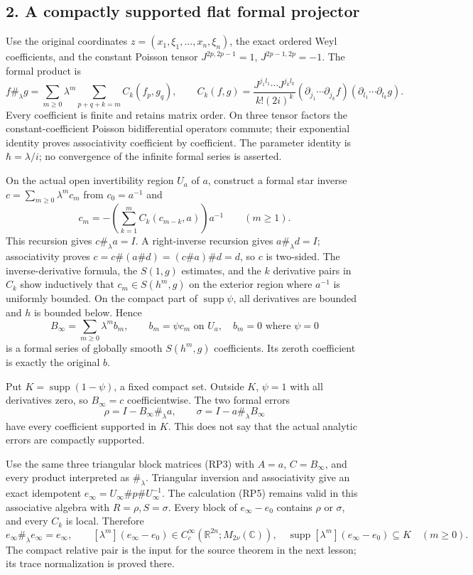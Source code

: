 \documentclass[
  11pt,
]{article}
\begin{document}
\subsection{2. A compactly supported flat formal
projector}\label{a-compactly-supported-flat-formal-projector}

Use the original coordinates \(z=(x_1,\xi_1,\ldots,x_n,\xi_n)\), the
exact ordered Weyl coefficients, and the constant Poisson tensor
\(J^{2p,2p-1}=1\), \(J^{2p-1,2p}=-1\). The formal product is \[
 f\#_\lambda g=\sum_{m\ge0}\lambda^m
       \sum_{p+q+k=m}C_k(f_p,g_q),\qquad
 C_k(f,g)=\frac{J^{j_1l_1}\cdots J^{j_kl_k}}
                {k!(2i)^k}
       (\partial_{j_1}\cdots\partial_{j_k}f)
       (\partial_{l_1}\cdots\partial_{l_k}g).
 \tag{RP7}
\] Every coefficient is finite and retains matrix order. On three tensor
factors the constant-coefficient Poisson bidifferential operators
commute; their exponential identity proves associativity coefficient by
coefficient. The parameter identity is \(\hbar=\lambda/i\); no
convergence of the infinite formal series is asserted.

On the actual open invertibility region \(U_a\) of \(a\), construct a
formal star inverse \(c=\sum_{m\ge0}\lambda^m c_m\) from \(c_0=a^{-1}\)
and \[
 c_m=-\left(\sum_{k=1}^{m}C_k(c_{m-k},a)\right)a^{-1}
 \qquad(m\ge1).
 \tag{RP8}
\] This recursion gives \(c\#_\lambda a=I\). A right-inverse recursion
gives \(a\#_\lambda d=I\); associativity proves
\(c=c\#(a\#d)=(c\#a)\#d=d\), so \(c\) is two-sided. The
inverse-derivative formula, the \(S(1,g)\) estimates, and the \(k\)
derivative pairs in \(C_k\) show inductively that \(c_m\in S(h^m,g)\) on
the exterior region where \(a^{-1}\) is uniformly bounded. On the
compact part of \(\operatorname{supp}\psi\), all derivatives are bounded
and \(h\) is bounded below. Hence \[
 B_\infty=\sum_{m\ge0}\lambda^m b_m,\qquad
 b_m=\psi c_m\text{ on }U_a,\quad b_m=0\text{ where }\psi=0
 \tag{RP9}
\] is a formal series of globally smooth \(S(h^m,g)\) coefficients. Its
zeroth coefficient is exactly the original \(b\).

Put \(K=\operatorname{supp}(1-\psi)\), a fixed compact set. Outside
\(K\), \(\psi=1\) with all derivatives zero, so \(B_\infty=c\)
coefficientwise. The two formal errors \[
 \rho=I-B_\infty\#_\lambda a,\qquad
 \sigma=I-a\#_\lambda B_\infty
 \tag{RP10}
\] have every coefficient supported in \(K\). This does not say that the
actual analytic errors are compactly supported.

Use the same three triangular block matrices (RP3) with \(A=a\),
\(C=B_\infty\), and every product interpreted as \(\#_\lambda\).
Triangular inversion and associativity give an exact idempotent
\(e_\infty=U_\infty\#p\#U_\infty^{-1}\). The calculation (RP5) remains
valid in this associative algebra with \(R=\rho,S=\sigma\). Every block
of \(e_\infty-e_0\) contains \(\rho\) or \(\sigma\), and every \(C_k\)
is local. Therefore \[
 e_\infty\#_\lambda e_\infty=e_\infty,\qquad
 [\lambda^m](e_\infty-e_0)
   \in C_c^\infty(\mathbb R^{2n};M_{2\nu}(\mathbb C)),
 \quad\operatorname{supp}[\lambda^m](e_\infty-e_0)\subseteq K
 \quad(m\ge0).
 \tag{RP11}
\] The compact relative pair is the input for the source theorem in the
next lesson; its trace normalization is proved there.
\end{document}
